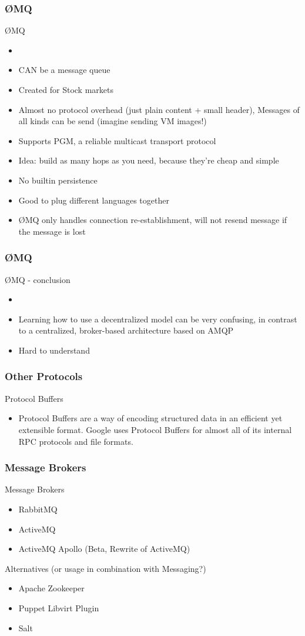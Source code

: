 \documentclass[serif,mathserif]{beamer}
\begin{document}
\begin{frame}
\frametitle{\O MQ}
\O MQ
\begin{itemize}
  \item
  \item CAN be a message queue
  \item Created for Stock markets
  \item Almost no protocol overhead (just plain content + small header),
  Messages of all kinds can be send (imagine sending VM images!)
  \item Supports PGM, a reliable multicast transport protocol
  \item Idea: build as many hops as you need, because they're cheap and simple
  \item No builtin persistence
  \item Good to plug different languages together
  \item \O MQ only handles connection re-establishment, will not resend message if the message is lost
\end{itemize}
\end{frame}

\begin{frame}
\frametitle{\O MQ}
\O MQ - conclusion
\begin{itemize}
  \item
  \item Learning how to use a decentralized model can be very confusing, in contrast to a centralized, broker-based
  architecture based on AMQP
  \item Hard to understand
\end{itemize}
\end{frame}

\begin{frame}
\frametitle{Other Protocols}
Protocol Buffers
\begin{itemize}
  \item Protocol Buffers are a way of encoding structured data in an efficient yet extensible format.
  Google uses Protocol Buffers for almost all of its internal RPC protocols and file formats.
\end{itemize}
\end{frame}

\begin{frame}
\frametitle{Message Brokers}
Message Brokers
\begin{itemize}
  \item RabbitMQ
  \item ActiveMQ
  \item ActiveMQ Apollo (Beta, Rewrite of ActiveMQ)
\end{itemize}
Alternatives (or usage in combination with Messaging?)
\begin{itemize}
  \item Apache Zookeeper
  \item Puppet Libvirt Plugin
  \item Salt
\end{itemize}
\end{frame}
\end{document}
